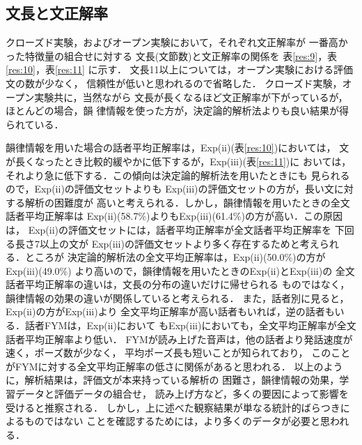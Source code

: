 \subsection{文長と文正解率}

クローズド実験，およびオープン実験において，それぞれ文正解率が
一番高かった特徴量の組合せに対する
文長(文節数)と文正解率の関係を
表\ref{res:9}，表\ref{res:10}，表\ref{res:11} に示す．
文長11以上については，オープン実験における評価文の数が少なく，
信頼性が低いと思われるので省略した．
クローズド実験，オープン実験共に，当然ながら
文長が長くなるほど文正解率が下がっているが，ほとんどの場合，韻
律情報を使った方が，決定論的解析法よりも良い結果が得られている．

韻律情報を用いた場合の話者平均正解率は，Exp(ii)(表\ref{res:10})においては，
文が長くなったとき比較的緩やかに低下するが，Exp(iii)(表\ref{res:11})に
おいては，
それより急に低下する．この傾向は決定論的解析法を用いたときにも
見られるので，Exp(ii)の評価文セットよりも
Exp(iii)の評価文セットの方が，長い文に対する解析の困難度が
高いと考えられる．しかし，韻律情報を用いたときの全文話者平均正解率は
Exp(ii)(58.7\%)よりもExp(iii)(61.4\%)の方が高い．この原因は，
Exp(ii)の評価文セットには，話者平均正解率が全文話者平均正解率を
下回る長さ7以上の文が 
Exp(iii)の評価文セットより多く存在するためと考えられる．ところが
決定論的解析法の全文平均正解率は，Exp(ii)(50.0\%)の方が 
Exp(iii)(49.0\%)
より高いので，韻律情報を用いたときのExp(ii)とExp(iii)の
全文話者平均正解率の違いは，文長の分布の違いだけに帰せられる
ものではなく，韻律情報の効果の違いが関係していると考えられる．
また，話者別に見ると，Exp(ii)の方がExp(iii)より
全文平均正解率が高い話者もいれば，逆の話者もいる．話者FYMは，Exp(ii)において
もExp(iii)においても，全文平均正解率が全文話者平均正解率より低い．
FYMが読み上げた音声は，他の話者より発話速度が速く，ポーズ数が少なく，
平均ポーズ長も短いことが知られており\cite{OZE-4}，
このことがFYMに対する全文平均正解率の低さに関係があると思われる．
以上のように，解析結果は，評価文が本来持っている解析の
困難さ，韻律情報の効果，学習データと評価データの組合せ，
読み上げ方など，多くの要因によって影響を受けると推察される．
しかし，上に述べた観察結果が単なる統計的ばらつきによるものではない
ことを確認するためには，より多くのデータが必要と思われる．

